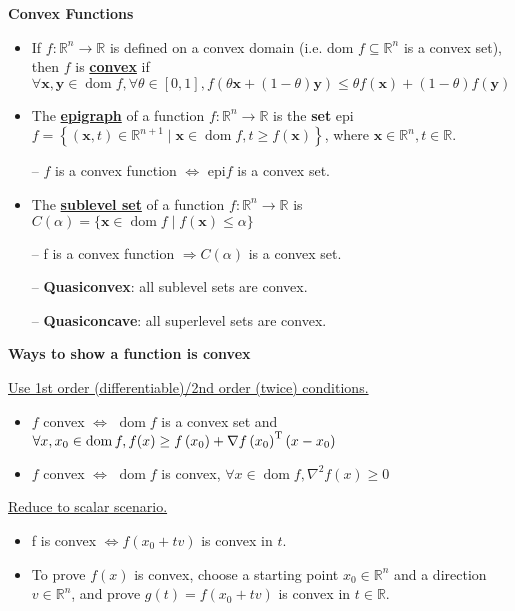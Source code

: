 {\LARGE \textbf{Convex Functions}}


\begin{itemize}
\item If $f: \mathbb{R}^{n} \rightarrow \mathbb{R}$ is defined on a convex domain (i.e. dom $f \subseteq \mathbb{R}^{n}$ is a convex set), then $f$ is \underline{\textbf{convex}} if $\forall \bm{x}, \bm{y} \in \operatorname{dom} f, \forall \theta \in[0,1], f\left(\theta \bm{x}+(1-\theta) \bm{y}\right) \leq \theta f(\bm{x})+(1-\theta) f(\bm{y})$

\item The \underline{\textbf{epigraph}} of a function $f: \mathbb{R}^{n} \rightarrow \mathbb{R}$ is the \textbf{set}
epi$f=\left\{(\bm{x}, t) \in \mathbb{R}^{n+1} \mid \bm{x} \in \operatorname{dom} f, t \geq f(\bm{x})\right\}$, where $\bm{x} \in \mathbb{R}^{n}, t \in \mathbb{R}$.

-- $f$ is a convex function $\Leftrightarrow$ epi$f$ is a convex set.

\item The \underline{\textbf{sublevel set}} of a function $f: \mathbb{R}^{n} \rightarrow \mathbb{R}$ is $C(\alpha)=\{\bm{x} \in \operatorname{dom} f \mid f(\bm{x}) \leq \alpha\}$

-- f is a convex function $\Rightarrow C(\alpha)$ is a convex set.

-- \textbf{Quasiconvex}: all sublevel sets are convex.

-- \textbf{Quasiconcave}: all superlevel sets are convex.

\end{itemize}

\textbf{Ways to show a function is convex}

\underline{Use 1st order (differentiable)/2nd order (twice) conditions.}

\begin{itemize}
    \item $f$ convex $\Leftrightarrow$ $\operatorname{dom} f$ is a convex set and $\forall x, {x}_{0} \in \operatorname{dom} f, \\ f({x}) \geq f\left({x}_{0}\right)+\nabla f\left({x}_{0}\right)^{\mathrm{T}}\left({x}-{x}_{0}\right)$
    \item $f$ convex $\Leftrightarrow$ $\operatorname{dom} f$ is convex, $\forall x \in \operatorname{dom} f, \nabla^2 f(x) \geq 0$
\end{itemize}


\underline{Reduce to scalar scenario.}
\begin{itemize}
    \item f is convex $\Leftrightarrow f(x_0+tv)$ is convex in $t$.
    \item To prove $f(x)$ is convex, choose a starting point $x_0 \in \mathbb{R}^n$ and a direction $v \in \mathbb{R}^n$, and prove $g(t)=f(x_0+tv)$ is convex in $t \in \mathbb{R}$.
\end{itemize}

